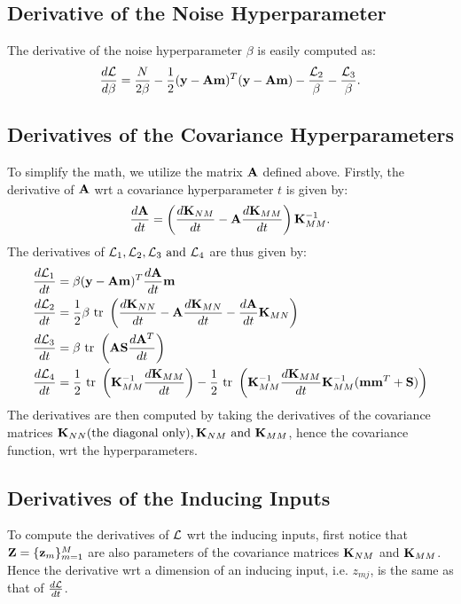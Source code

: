 \documentclass{article} %
\begin{document}
\subsection{Derivative of the Noise Hyperparameter}
The derivative of the noise hyperparameter $\beta$ is easily computed as:
\begin{align}
\frac{d \mathcal{L}}{d\beta} = \frac{N}{2\beta} - \frac{1}{2} (\mathbf{y} - \mathbf{A}\mathbf{m})^T (\mathbf{y} - \mathbf{A}\mathbf{m}) - \frac{\mathcal{L}_2}{\beta} - \frac{\mathcal{L}_3}{\beta}.
\end{align}
\subsection{Derivatives of the Covariance Hyperparameters}  
To simplify the math, we utilize the matrix $\mathbf{A}$ defined above.
Firstly, the derivative of $\mathbf{A}$ wrt a covariance hyperparameter $t$ is given by:
\begin{align}
\frac{d \mathbf{A}}{dt} = \left(\frac{d\mathbf{K}_{NM}}{dt} - \mathbf{A} \frac{d \mathbf{K}_{MM}}{dt}\right)\mathbf{K}_{MM}^{-1}.
\end{align}
The derivatives of $\mathcal{L}_1, \mathcal{L}_2, \mathcal{L}_3 \text{ and } \mathcal{L}_4$ are thus given by:
\begin{align}
\frac{d \mathcal{L}_1}{dt} &= \beta (\mathbf{y} - \mathbf{A}\mathbf{m})^T \frac{d \mathbf{A}}{dt} \mathbf{m} \\
\frac{d \mathcal{L}_2}{dt} &= \frac{1}{2}\beta \mbox{ \rm tr } \left(\frac{d\mathbf{K}_{NN}}{dt} - \mathbf{A} \frac{d\mathbf{K}_{MN}}{dt} - \frac{d\mathbf{A}}{dt} \mathbf{K}_{MN}\right) \\
\frac{d \mathcal{L}_3}{dt} &= \beta \mbox{ \rm tr } \left(\mathbf{A} \mathbf{S} \frac{d\mathbf{A}^T}{dt} \right) \\
\frac{d \mathcal{L}_4}{dt} &= \frac{1}{2}  \mbox{ \rm tr } \left(\mathbf{K}_{MM}^{-1} \frac{d \mathbf{K}_{MM}}{dt}\right) - \frac{1}{2} \mbox{ \rm tr } \left(\mathbf{K}_{MM}^{-1} \frac{d \mathbf{K}_{MM}}{dt} \mathbf{K}_{MM}^{-1} (\mathbf{m} \mathbf{m}^T + \mathbf{S}) \right) 
\end{align}
The derivatives are then computed by taking the derivatives of the covariance matrices $\mathbf{K}_{NN} (\text{the diagonal only}), \mathbf{K}_{NM} \text{ and }  \mathbf{K}_{MM}$, hence the covariance function, wrt the hyperparameters. 

\subsection{Derivatives of the Inducing Inputs}
To compute the derivatives of $\mathcal{L}$ wrt the inducing inputs, first notice that $\mathbf{Z} = \{\mathbf{z}_m\}_{m=1}^M$ are also parameters of the covariance matrices $\mathbf{K}_{NM}$ and $\mathbf{K}_{MM}$.
Hence the derivative wrt a dimension of an inducing input, i.e. $z_{mj}$, is the same as that of $\frac{d \mathcal{L}}{dt}$.
\end{document}
